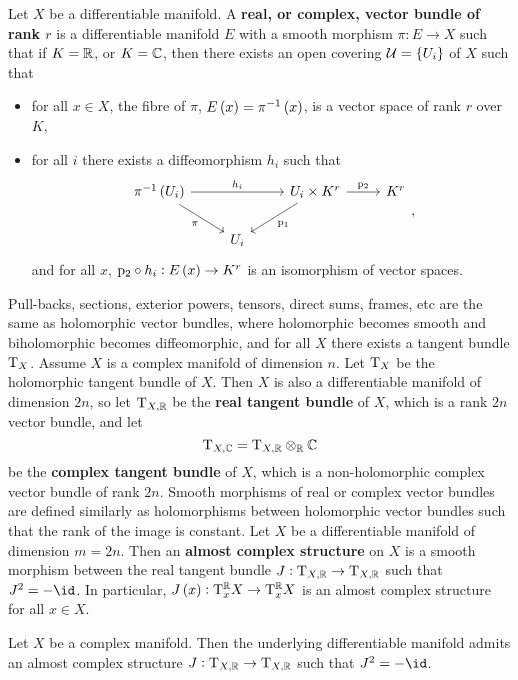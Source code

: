 \begin{definition}
Let $ X $ be a differentiable manifold. A \textbf{real, or complex, vector bundle of rank $ r $} is a differentiable manifold $ E $ with a smooth morphism $ \pi : E \to X $ such that if $ K = \mathbb{R} $, or $ K = \mathbb{C} $, then there exists an open covering $ \UUU = \cbr{U_i} $ of $ X $ such that
\begin{itemize}
\item for all $ x \in X $, the fibre of $ \pi $, $ E\br{x} = \pi^{-1}\br{x} $, is a vector space of rank $ r $ over $ K $,
\item for all $ i $ there exists a diffeomorphism $ h_i $ such that
$$
\begin{tikzcd}
\pi^{-1}\br{U_i} \arrow{rr}{h_i} \arrow[swap]{dr}{\pi} & & U_i \times K^r \arrow{r}{\p_2} \arrow{dl}{\p_1} & K^r \\
& U_i & &
\end{tikzcd},
$$
and for all $ x $, $ \p_2 \circ h_i : E\br{x} \to K^r $ is an isomorphism of vector spaces.
\end{itemize}
\end{definition}

Pull-backs, sections, exterior powers, tensors, direct sums, frames, etc are the same as holomorphic vector bundles, where holomorphic becomes smooth and biholomorphic becomes diffeomorphic, and for all $ X $ there exists a tangent bundle $ \mathrm{T}_X $. Assume $ X $ is a complex manifold of dimension $ n $. Let $ \mathrm{T}_X $ be the holomorphic tangent bundle of $ X $. Then $ X $ is also a differentiable manifold of dimension $ 2n $, so let $ \mathrm{T}_{X, \mathbb{R}} $ be the \textbf{real tangent bundle} of $ X $, which is a rank $ 2n $ vector bundle, and let
$$ \mathrm{T}_{X, \mathbb{C}} = \mathrm{T}_{X, \mathbb{R}} \otimes_{\mathbb{R}} \mathbb{C} $$
be the \textbf{complex tangent bundle} of $ X $, which is a non-holomorphic complex vector bundle of rank $ 2n $. Smooth morphisms of real or complex vector bundles are defined similarly as holomorphisms between holomorphic vector bundles such that the rank of the image is constant. Let $ X $ be a differentiable manifold of dimension $ m = 2n $. Then an \textbf{almost complex structure} on $ X $ is a smooth morphism between the real tangent bundle $ J : \mathrm{T}_{X, \mathbb{R}} \to \mathrm{T}_{X, \mathbb{R}} $ such that $ J^2 = -\id $. In particular, $ J\br{x} : \T_x^\RR X \to \T_x^\RR X $ is an almost complex structure for all $ x \in X $.


\begin{proposition}
Let $ X $ be a complex manifold. Then the underlying differentiable manifold admits an almost complex structure $ J : \mathrm{T}_{X, \mathbb{R}} \to \mathrm{T}_{X, \mathbb{R}} $ such that $ J^2 = -\id $.
\end{proposition}

